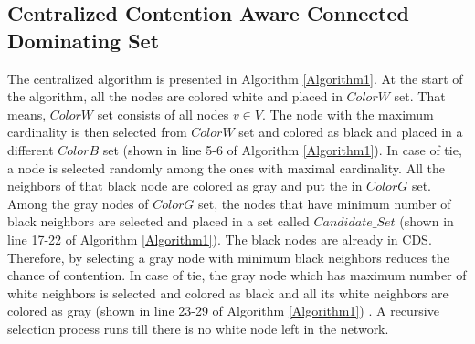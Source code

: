 \subsection{Centralized Contention Aware Connected Dominating Set}
The centralized algorithm is presented in Algorithm \ref{Algorithm1}.
At the start of the algorithm, all the nodes are colored white and placed in $ColorW$ set. That means, $ColorW$ set consists of all nodes $v \in V$. 
The node with the maximum cardinality is then selected from $ColorW$ set and colored as black and placed in a different $ColorB$ set (shown in line 5-6 of Algorithm \ref{Algorithm1}). In case of tie, a node is selected randomly among the ones with maximal cardinality. All the neighbors of that black node are colored as gray and put the in $ColorG$ set. 
Among the gray nodes of $ColorG$ set, the nodes that have minimum number of black neighbors are selected and placed in a set called \textit{$Candidate\_Set$} (shown in line 17-22 of Algorithm \ref{Algorithm1}). The black nodes are already in CDS. Therefore, by selecting a gray node with minimum black neighbors reduces the chance of contention. 
In case of tie,
the gray node which has maximum number of white neighbors is  selected and colored as black and all its white neighbors are colored as gray (shown in line 23-29 of Algorithm \ref{Algorithm1}) . A recursive selection process runs till there is no white node left in the network. 

